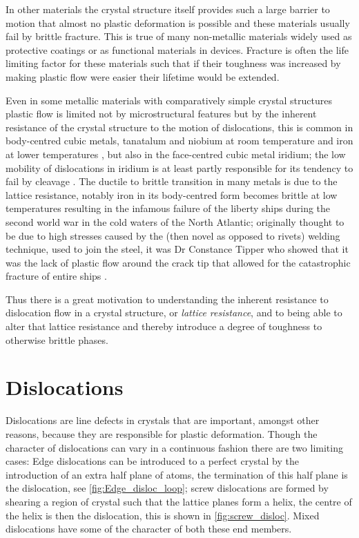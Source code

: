 In other materials the crystal structure itself provides such a large barrier to motion that almost no plastic deformation is possible and these materials usually fail by brittle fracture. This is true of many non-metallic materials widely used as protective coatings or as functional materials in devices. Fracture is often the life limiting factor for these materials such that if their toughness was increased by making plastic flow were easier their lifetime would be extended. 

Even in some metallic materials with comparatively simple crystal structures plastic flow is limited not by microstructural features but by the inherent resistance of the crystal structure to the motion of dislocations, this is common in body-centred cubic metals, tanatalum and niobium at room temperature and iron at lower temperatures \cite{Christian1983,Weinberger2013}, but also in the face-centred cubic metal iridium; the low mobility of dislocations in iridium is at least partly responsible for its tendency to fail by cleavage \cite{Panfilov2001}. The ductile to brittle transition in many metals is due to the lattice resistance, notably iron in its body-centred form becomes brittle at low temperatures resulting in the infamous failure of the liberty ships during the second world war in the cold waters of the North Atlantic; originally thought to be due to high stresses caused by the (then novel as opposed to rivets) welding technique, used to join the steel, it was Dr Constance Tipper who showed that it was the lack of plastic flow around the crack tip that allowed for the catastrophic fracture of entire ships \cite{Cottrell1997}. 

Thus there is a great motivation to understanding the inherent resistance to dislocation flow in a crystal structure, or \emph{lattice resistance}, and to being able to alter that lattice resistance and thereby introduce a degree of toughness to otherwise brittle phases.


\section{Dislocations} %
\FloatBarrier

Dislocations are line defects in crystals that are important, amongst other reasons, because they are responsible for plastic deformation. Though the character of dislocations can vary in a continuous fashion there are two limiting cases: Edge dislocations can be introduced to a perfect crystal by the introduction of an extra half plane of atoms, the termination of this half plane is the dislocation, see \autoref{fig:Edge_disloc_loop}; screw dislocations are formed by shearing a region of crystal such that the lattice planes form a helix, the centre of the helix is then the dislocation, this is shown in \autoref{fig:screw_disloc}. Mixed dislocations have some of the character of both these end members.



